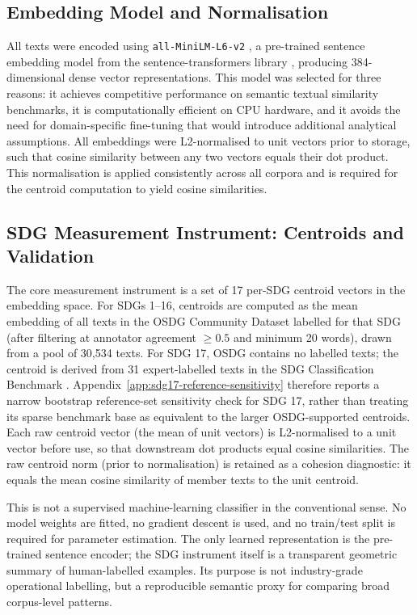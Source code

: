 \documentclass[12pt,a4paper]{article}
\begin{document}
\subsection{Embedding Model and Normalisation}

All texts were encoded using \texttt{all-MiniLM-L6-v2} \parencite{all-minilm-l6-v2}, a pre-trained sentence embedding model from the sentence-transformers library \parencite{Reimers2019}, producing 384-dimensional dense vector representations. This model was selected for three reasons: it achieves competitive performance on semantic textual similarity benchmarks, it is computationally efficient on CPU hardware, and it avoids the need for domain-specific fine-tuning that would introduce additional analytical assumptions. All embeddings were L2-normalised to unit vectors prior to storage, such that cosine similarity between any two vectors equals their dot product. This normalisation is applied consistently across all corpora and is required for the centroid computation to yield cosine similarities.

\subsection{SDG Measurement Instrument: Centroids and Validation}

The core measurement instrument is a set of 17 per-SDG centroid vectors in the embedding space. For SDGs 1--16, centroids are computed as the mean embedding of all texts in the OSDG Community Dataset labelled for that SDG (after filtering at annotator agreement $\geq 0.5$ and minimum 20 words), drawn from a pool of 30,534 texts. For SDG 17, OSDG contains no labelled texts; the centroid is derived from 31 expert-labelled texts in the SDG Classification Benchmark \parencite{SDGBenchmark}. Appendix~\ref{app:sdg17-reference-sensitivity} therefore reports a narrow bootstrap reference-set sensitivity check for SDG 17, rather than treating its sparse benchmark base as equivalent to the larger OSDG-supported centroids. Each raw centroid vector (the mean of unit vectors) is L2-normalised to a unit vector before use, so that downstream dot products equal cosine similarities. The raw centroid norm (prior to normalisation) is retained as a cohesion diagnostic: it equals the mean cosine similarity of member texts to the unit centroid.

This is not a supervised machine-learning classifier in the conventional sense. No model weights are fitted, no gradient descent is used, and no train/test split is required for parameter estimation. The only learned representation is the pre-trained sentence encoder; the SDG instrument itself is a transparent geometric summary of human-labelled examples. Its purpose is not industry-grade operational labelling, but a reproducible semantic proxy for comparing broad corpus-level patterns.
\end{document}

